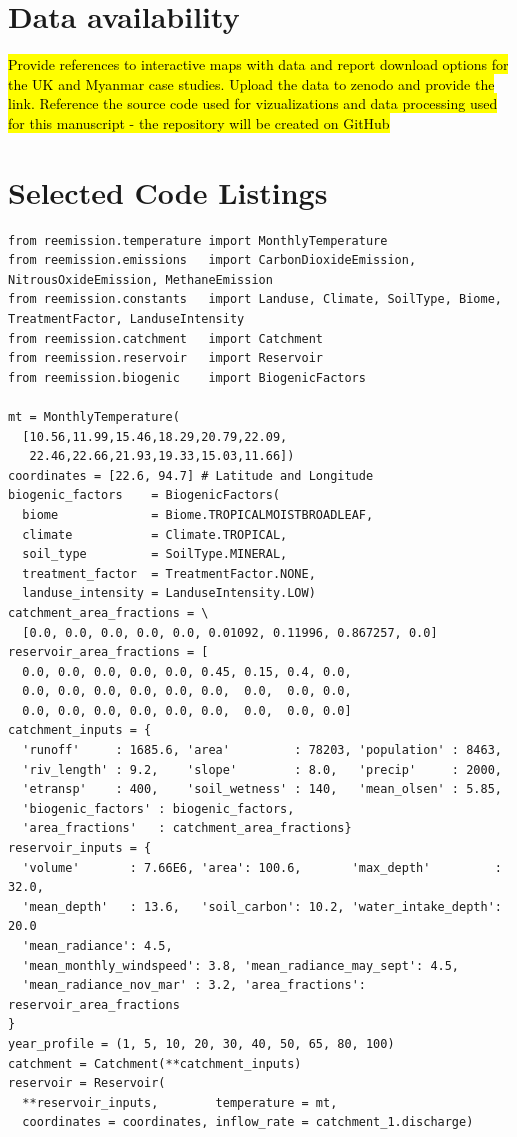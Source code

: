 \documentclass[final,1p,times]{elsarticle}
\let\oldappendix\appendix
\renewcommand{\appendix}{%
    \oldappendix
    \setcounter{figure}{0}
    \setcounter{table}{0}
    \setcounter{equation}{0}
    \setcounter{lstlisting}{0}
    
    \renewcommand{\thefigure}{A.\arabic{figure}}
    \renewcommand{\thetable}{A.\arabic{table}}
    \renewcommand{\theequation}{A.\arabic{equation}}
    \renewcommand{\thelstlisting}{A.\arabic{lstlisting}}
  }
\begin{document}
\section{Data availability}
\hl{Provide references to interactive maps with data and report download options for the UK and Myanmar case studies. Upload the data to zenodo and provide the link. Reference the source code used for vizualizations and data processing used for this manuscript - the repository will be created on GitHub}

\appendix

\section{Selected Code Listings}
\label{app1}

\begin{minipage}{\textwidth}
\begin{lstlisting}[language=PythonReemission, label={lst:em_calc_setup}, caption={Use of Re-Emission as a library: step-by-step problem formulation.}]
from reemission.temperature import MonthlyTemperature
from reemission.emissions   import CarbonDioxideEmission, NitrousOxideEmission, MethaneEmission
from reemission.constants   import Landuse, Climate, SoilType, Biome, TreatmentFactor, LanduseIntensity
from reemission.catchment   import Catchment
from reemission.reservoir   import Reservoir
from reemission.biogenic    import BiogenicFactors

mt = MonthlyTemperature(
  [10.56,11.99,15.46,18.29,20.79,22.09,
   22.46,22.66,21.93,19.33,15.03,11.66])
coordinates = [22.6, 94.7] # Latitude and Longitude
biogenic_factors    = BiogenicFactors(
  biome             = Biome.TROPICALMOISTBROADLEAF,
  climate           = Climate.TROPICAL,
  soil_type         = SoilType.MINERAL,
  treatment_factor  = TreatmentFactor.NONE,
  landuse_intensity = LanduseIntensity.LOW)
catchment_area_fractions = \
  [0.0, 0.0, 0.0, 0.0, 0.0, 0.01092, 0.11996, 0.867257, 0.0]
reservoir_area_fractions = [
  0.0, 0.0, 0.0, 0.0, 0.0, 0.45, 0.15, 0.4, 0.0, 
  0.0, 0.0, 0.0, 0.0, 0.0, 0.0,  0.0,  0.0, 0.0, 
  0.0, 0.0, 0.0, 0.0, 0.0, 0.0,  0.0,  0.0, 0.0]
catchment_inputs = {
  'runoff'     : 1685.6, 'area'         : 78203, 'population' : 8463, 
  'riv_length' : 9.2,    'slope'        : 8.0,   'precip'     : 2000,   
  'etransp'    : 400,    'soil_wetness' : 140,   'mean_olsen' : 5.85, 
  'biogenic_factors' : biogenic_factors,
  'area_fractions'   : catchment_area_fractions}
reservoir_inputs = {
  'volume'       : 7.66E6, 'area': 100.6,       'max_depth'         : 32.0, 
  'mean_depth'   : 13.6,   'soil_carbon': 10.2, 'water_intake_depth': 20.0
  'mean_radiance': 4.5,    
  'mean_monthly_windspeed': 3.8, 'mean_radiance_may_sept': 4.5, 
  'mean_radiance_nov_mar' : 3.2, 'area_fractions': reservoir_area_fractions
}    
year_profile = (1, 5, 10, 20, 30, 40, 50, 65, 80, 100)
catchment = Catchment(**catchment_inputs)
reservoir = Reservoir(
  **reservoir_inputs,        temperature = mt,
  coordinates = coordinates, inflow_rate = catchment_1.discharge)
\end{lstlisting}
\end{minipage}
\end{document}
